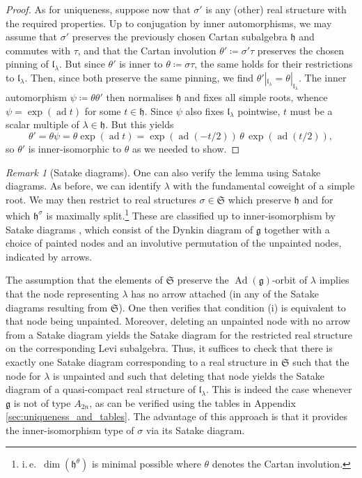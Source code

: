 \documentclass{amsart}
\newcommand{\ie}{i.\,e.}
\newcommand{\Ad}{\operatorname{Ad}}
\newcommand{\ad}{\operatorname{ad}}
\newcommand{\g}{\mathfrak{g}}
\newcommand{\h}{\mathfrak{h}}
\newcommand{\el}{\mathfrak{l}}
\theoremstyle{definition}
\theoremstyle{plain}
\theoremstyle{remark}
\newtheorem{rmk}[defn]{Remark}
\begin{document}
\begin{proof}
    As for uniqueness, suppose now that $\sigma'$ is any (other) real structure with the required properties. Up to conjugation by inner automorphisms, we may assume that $\sigma'$ preserves the previously chosen Cartan subalgebra $\h$ and commutes with $\tau$, and that the Cartan involution $\theta' \coloneqq \sigma'\tau$ preserves the chosen pinning of $\el_\lambda$. But since $\theta'$ is inner to $\theta\coloneqq\sigma\tau$, the same holds for their restrictions to $\el_\lambda$. Then, since both preserve the same pinning, we find $\theta'|_{\el_\lambda} = \theta|_{\el_\lambda}$. The inner automorphism $\psi\coloneqq \theta\theta'$ then normalises $\h$ and fixes all simple roots, whence $\psi = \exp(\ad t)$ for some $t\in \h$. Since $\psi$ also fixes $\el_\lambda$ pointwise, $t$ must be a scalar multiple of $\lambda\in \h$. But this yields
    $$
        \theta'
        =
        \theta \psi
        =
        \theta \exp (\ad t)
        =
        \exp(\ad (-t/2)) \,  \theta  \, \exp(\ad(t/2)),
    $$
    so $\theta'$ is inner-isomorphic to $\theta$ as we needed to show.
\end{proof}

\begin{rmk}[Satake diagrams]
\label{rmk:Satake_check}
    One can also verify the lemma using Satake diagrams. As before, we can identify $\lambda$ with the fundamental coweight of a simple root. We may then restrict to real structures $\sigma\in \mathfrak{S}$ which preserve $\h$ and for which $\h^\sigma$ is maximally split.\footnote{\ie\ $\dim(\h^\theta)$ is minimal possible where $\theta$ denotes the Cartan involution.} These are classified up to inner-isomorphism by Satake diagrams \cite{Araki1962_classification}, which consist of the Dynkin diagram of $\g$ together with a choice of painted nodes and an involutive permutation of the unpainted nodes, indicated by arrows. 
    
    The assumption that the elements of $\mathfrak{S}$ preserve the $\Ad(\g)$-orbit of $\lambda$ implies that the node representing $\lambda$ has no arrow attached (in any of the Satake diagrams resulting from $\mathfrak{S}$). One then verifies that condition (i) is equivalent to that node being unpainted. Moreover, deleting an unpainted node with no arrow from a Satake diagram yields the Satake diagram for the restricted real structure on the corresponding Levi subalgebra. Thus, it suffices to check that there is exactly one Satake diagram corresponding to a real structure in $\mathfrak{S}$ such that the node for $\lambda$ is unpainted and such that deleting that node yields the Satake diagram of a quasi-compact real structure of $\el_\lambda$. This is indeed the case whenever $\g$ is not of type $A_{2n}$, as can be verified using the tables in Appendix \ref{sec:uniqueness_and_tables}. The advantage of this approach is that it provides the inner-isomorphism type of $\sigma$ via its Satake diagram.
\end{rmk}
\end{document}
